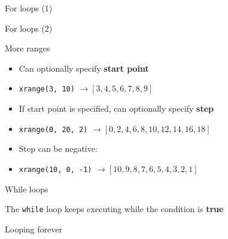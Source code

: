 \begin{frame}{For loops (1)}
	\socrative
\end{frame}

\begin{frame}{For loops (2)}
	\socrative
\end{frame}

\begin{frame}{More ranges}
	\begin{itemize}
		\pause\item Can optionally specify \textbf{start point}
		\pause\item \lstinline{xrange(3, 10)} $\to [3, 4, 5, 6, 7, 8, 9]$
		\pause\item If start point is specified, can optionally specify \textbf{step}
		\pause\item \lstinline{xrange(0, 20, 2)} $\to [0, 2, 4, 6, 8, 10, 12, 14, 16, 18]$
		\pause\item Step can be negative:
		\pause\item \lstinline{xrange(10, 0, -1)} $\to [10, 9, 8, 7, 6, 5, 4, 3, 2, 1]$
	\end{itemize}
\end{frame}

\begin{frame}{While loops}
	\socrative
	
	The \lstinline{while} loop keeps executing while the condition is \textbf{true}
	
\end{frame}

\begin{frame}{Looping forever}
	
\end{frame}
